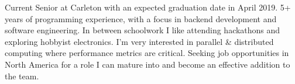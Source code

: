 
\begin{cvparagraph}

Current Senior at Carleton with an expected graduation date in April 2019. 5+ years of programming experience, with a focus in backend development and software engineering. In between schoolwork I like attending hackathons and exploring hobbyist electronics. I'm very interested in parallel \& distributed computing where performance metrics are critical. Seeking job opportunities in North America for a role I can mature into and become an effective addition to the team.

\end{cvparagraph}